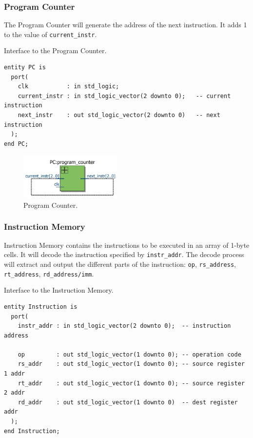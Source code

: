 \documentclass[a4paper, 11pt,oneside]{article}
\begin{document}
\subsubsection{Program Counter}
The Program Counter will generate the address of the next instruction. It adds 
1 to the value of \texttt{current_instr}.
\begin{listing}[H]
\caption{Interface to the Program Counter.}
\label{code:pc}
\begin{verbatim}
entity PC is
  port(
    clk           : in std_logic;
    current_instr : in std_logic_vector(2 downto 0);   -- current instruction
    next_instr    : out std_logic_vector(2 downto 0)   -- next instruction
  );
end PC;
\end{verbatim}
\end{listing}

\begin{figure}[H]
	\begin{center}
	\includegraphics[width=2in]{pc.png}
	\caption{Program Counter.}
	\label{fig:pc} 
	\end{center}
\end{figure}

\subsubsection{Instruction Memory}
Instruction Memory contains the instructions to be executed in an array of 
1-byte cells. It will decode the instruction specified by 
\texttt{instr_addr}. The decode process will extract and output the 
different parts of the instruction: \texttt{op}, 
\texttt{rs_address}, \texttt{rt_address}, 
\texttt{rd_address/imm}.

\begin{listing}[H]
\caption{Interface to the Instruction Memory.}
\label{code:im}
\begin{verbatim}
entity Instruction is
  port(
    instr_addr : in std_logic_vector(2 downto 0);  -- instruction address

    op         : out std_logic_vector(1 downto 0); -- operation code
    rs_addr    : out std_logic_vector(1 downto 0); -- source register 1 addr    
    rt_addr    : out std_logic_vector(1 downto 0); -- source register 2 addr
    rd_addr    : out std_logic_vector(1 downto 0)  -- dest register addr
  );
end Instruction;


\end{verbatim}
\end{listing}
\end{document}
